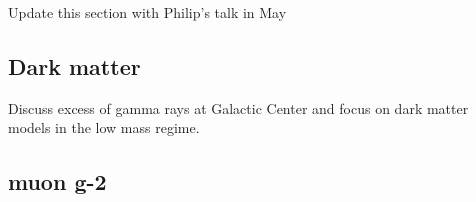 Update this section with Philip's talk in May
\subsection{Dark matter}
Discuss excess of gamma rays at Galactic Center and focus on dark matter models in the low mass regime. 
\subsection{muon g-2}

